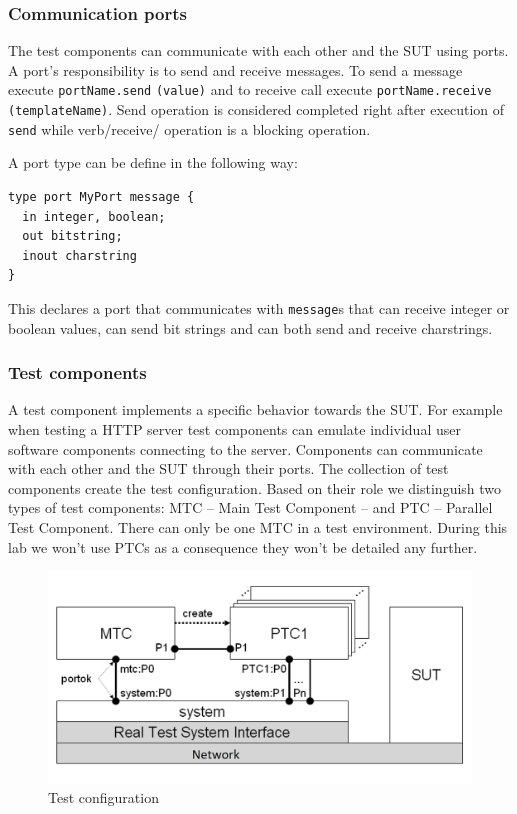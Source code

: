 \documentclass[a4paper]{article}
\begin{document}
\subsubsection{Communication ports}

The test components can communicate with each other and the SUT using ports. A port's responsibility is to send and
receive messages. To send a message execute \verb/portName.send/ \verb/(value)/ and to receive
call execute \verb/portName.receive/ \verb/(templateName)/. Send operation is considered completed right
after execution of \verb/send/ while verb/receive/ operation is a blocking operation.

A port type can be define in the following way:
{\footnotesize
\begin{lstlisting}
type port MyPort message {
  in integer, boolean;
  out bitstring;
  inout charstring
}
\end{lstlisting}
}

This declares a port that communicates with \verb/message/s that can receive integer or boolean values,
can send bit strings and can both send and receive charstrings.

\subsubsection{Test components}
A test component implements a specific behavior towards the SUT. For example when testing a HTTP server test components
can emulate individual user software components connecting to the server.
Components can communicate with each other and the SUT through their ports. The collection of test components create
the test configuration. Based on their role we distinguish two types of test components: MTC -- Main Test Component --
and PTC -- Parallel Test Component. There can only be one MTC in a test environment. During this lab we won't use PTCs
as a consequence they won't be detailed any further.

\begin{figure}[H]
    \centering
    \includegraphics[width=\textwidth]{figures/TC.png}
    \caption{Test configuration}
    \label{fig:tc}
\end{figure}
\end{document}
